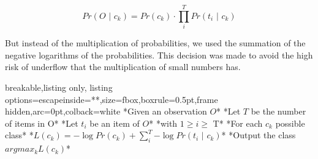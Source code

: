$$Pr(O\text{ | }c_k) = Pr(c_k)\cdot\prod_i^T{Pr(t_i\text{ | } c_k)}$$

But instead of the multiplication of probabilities, we used the summation of the negative logarithms of the probabilities. This decision was made to avoid the high risk of underflow that the multiplication of small numbers has.
\begin{tcblisting}{breakable,listing only,
    listing options={escapeinside={*}{*}},size=fbox,boxrule=0.5pt,frame hidden,arc=0pt,colback=white}
*Given an observation $O$*
    *Let $T$ be the number of items in O*
    *Let $t_i$ be an item of $O$*
        *with $1 \geq i \geq$ T*
    *For each $c_k$ possible class*
        *$L(c_k) = -\log Pr(c_k)+\sum_i^T{-\log Pr(t_i\text{ | } c_k)}$*
    *Output the class $argmax_k L(c_k)$*
\end{tcblisting}

